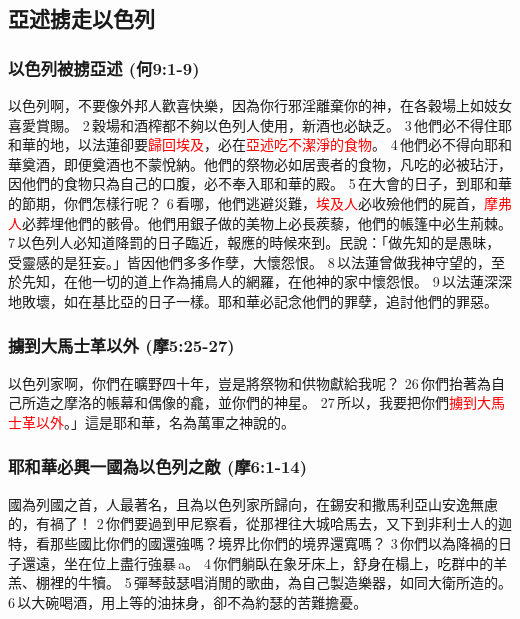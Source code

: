 \subsection{亞述掳走以色列}
\subsubsection{以色列被掳亞述 (何9:1-9)}

以色列啊，不要像外邦人歡喜快樂，因為你行邪淫離棄你的神，在各穀場上如妓女喜愛賞賜。 2 穀場和酒榨都不夠以色列人使用，新酒也必缺乏。 3 他們必不得住耶和華的地，以法蓮卻要\textcolor{red}{歸回埃及}，必在\textcolor{red}{亞述吃不潔淨的食物}。 4 他們必不得向耶和華奠酒，即便奠酒也不蒙悅納。他們的祭物必如居喪者的食物，凡吃的必被玷汙，因他們的食物只為自己的口腹，必不奉入耶和華的殿。 5 在大會的日子，到耶和華的節期，你們怎樣行呢？ 6 看哪，他們逃避災難，\textcolor{red}{埃及人}必收殮他們的屍首，\textcolor{red}{摩弗人}必葬埋他們的骸骨。他們用銀子做的美物上必長蒺藜，他們的帳篷中必生荊棘。 7 以色列人必知道降罰的日子臨近，報應的時候來到。民說：「做先知的是愚昧，受靈感的是狂妄。」皆因他們多多作孽，大懷怨恨。 8 以法蓮曾做我神守望的，至於先知，在他一切的道上作為捕鳥人的網羅，在他神的家中懷怨恨。 9 以法蓮深深地敗壞，如在基比亞的日子一樣。耶和華必記念他們的罪孽，追討他們的罪惡。

\subsubsection{擄到大馬士革以外 (摩5:25-27)}
以色列家啊，你們在曠野四十年，豈是將祭物和供物獻給我呢？ 26 你們抬著為自己所造之摩洛的帳幕和偶像的龕，並你們的神星。 27 所以，我要把你們\textcolor{red}{擄到大馬士革以外}。」這是耶和華，名為萬軍之神說的。

\subsubsection{耶和華必興一國為以色列之敵 (摩6:1-14)}
國為列國之首，人最著名，且為以色列家所歸向，在錫安和撒馬利亞山安逸無慮的，有禍了！ 2 你們要過到甲尼察看，從那裡往大城哈馬去，又下到非利士人的迦特，看那些國比你們的國還強嗎？境界比你們的境界還寬嗎？ 3 你們以為降禍的日子還遠，坐在位上盡行強暴 a。 4 你們躺臥在象牙床上，舒身在榻上，吃群中的羊羔、棚裡的牛犢。 5 彈琴鼓瑟唱消閒的歌曲，為自己製造樂器，如同大衛所造的。 6 以大碗喝酒，用上等的油抹身，卻不為約瑟的苦難擔憂。

